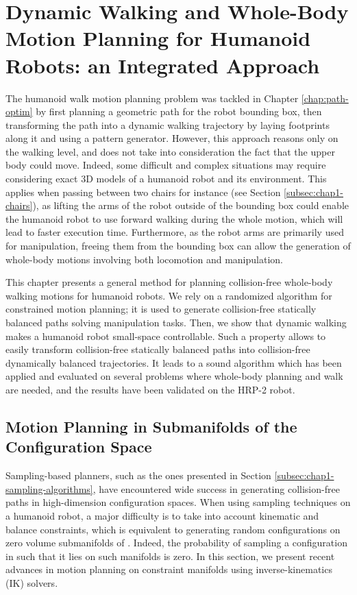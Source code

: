 \chapter{Dynamic Walking and Whole-Body Motion Planning for Humanoid Robots: an Integrated Approach}
\label{chap:wholebody-planning}

The humanoid walk motion planning problem was tackled in Chapter
\ref{chap:path-optim} by first planning a geometric path for the robot
bounding box, then transforming the path into a dynamic walking
trajectory by laying footprints along it and using a pattern
generator. However, this approach reasons only on the walking level,
and does not take into consideration the fact that the upper body
could move. Indeed, some difficult and complex situations may require
considering exact 3D models of a humanoid robot and its
environment. This applies when passing between two chairs for instance
(see Section \ref{subsec:chap1-chairs}), as lifting the arms of the
robot outside of the bounding box could enable the humanoid robot to
use forward walking during the whole motion, which will lead to faster
execution time. Furthermore, as the robot arms are primarily used for
manipulation, freeing them from the bounding box can allow the
generation of whole-body motions involving both locomotion and
manipulation.

This chapter presents a general method for planning collision-free
whole-body walking motions for humanoid robots. We rely on a
randomized algorithm for constrained motion planning; it is used to
generate collision-free statically balanced paths solving manipulation
tasks. Then, we show that dynamic walking makes a humanoid robot
small-space controllable. Such a property allows to easily transform
collision-free statically balanced paths into collision-free
dynamically balanced trajectories. It leads to a sound algorithm which
has been applied and evaluated on several problems where whole-body
planning and walk are needed, and the results have been validated on
the HRP-2 robot.

\section{Motion Planning in Submanifolds of the Configuration Space}
\label{sec:chap2-planning-submanifolds}

Sampling-based planners, such as the ones presented in Section
\ref{subsec:chap1-sampling-algorithms}, have encountered wide success
in generating collision-free paths in high-dimension configuration
spaces. When using sampling techniques on a humanoid robot, a major
difficulty is to take into account kinematic and balance constraints,
which is equivalent to generating random configurations on zero volume
submanifolds of {\cspace}. Indeed, the probability of sampling a
configuration  in {\cspace} such that it lies on such
manifolds is zero. In this section, we present recent advances in
motion planning on constraint manifolds using inverse-kinematics (IK)
solvers.


